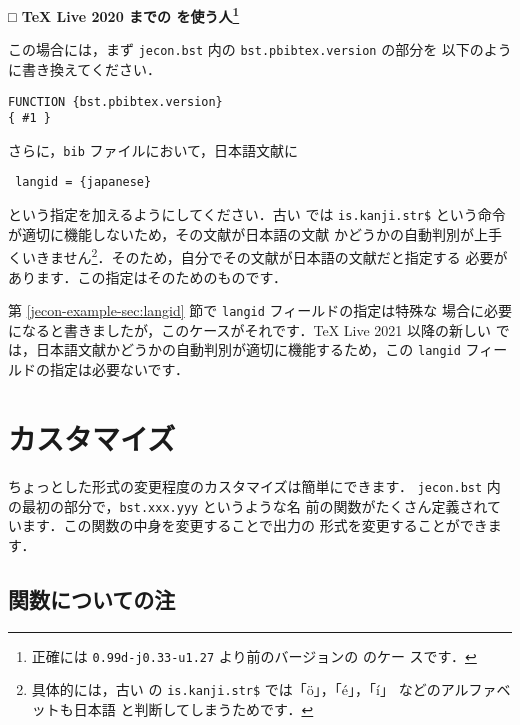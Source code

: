 \documentclass[article]{jlreq}
\newcommand{\midashiii}[1]{\noindent \textbf{□ #1}}
\begin{document}
\vspace*{1em}

\midashiii{TeX Live 2020 までの \upBibTeX を使う人\footnote{正確には
       \texttt{0.99d-j0.33-u1.27} より前のバージョンの \upBibTeX のケー
       スです．}}

この場合には，まず \texttt{jecon.bst} 内の \texttt{bst.pbibtex.version} の部分を
以下のように書き換えてください．
\begin{screen}
\begin{verbatim}
FUNCTION {bst.pbibtex.version}
{ #1 }
\end{verbatim}
\end{screen}

\vspace*{1em}

さらに，\texttt{bib} ファイルにおいて，日本語文献に
\begin{screen}
\begin{verbatim}
 langid = {japanese}
\end{verbatim}
\end{screen}
という指定を加えるようにしてください．古い \upBibTeX では
\texttt{is.kanji.str\$} という命令が適切に機能しないため，その文献が日本語の文献
かどうかの自動判別が上手くいきません\footnote{具体的には，古い \upBibTeX
の \texttt{is.kanji.str\$} では「ö」，「é」，「í」 などのアルファベットも日本語
と判断してしまうためです．}．そのため，自分でその文献が日本語の文献だと指定する
必要があります．この指定はそのためのものです．

第 \ref{jecon-example-sec:langid} 節で \texttt{langid} フィールドの指定は特殊な
場合に必要になると書きましたが，このケースがそれです．TeX Live 2021 以降の新しい
\upBibTeX では，日本語文献かどうかの自動判別が適切に機能するため，この
\texttt{langid} フィールドの指定は必要ないです．


\section{カスタマイズ}

ちょっとした形式の変更程度のカスタマイズは簡単にできます．
\texttt{jecon.bst} 内の最初の部分で，\texttt{bst.xxx.yyy} というような名
前の関数がたくさん定義されています．この関数の中身を変更することで出力の
形式を変更することができます．

\subsection{関数についての注}
\end{document}
